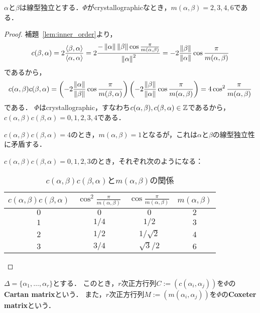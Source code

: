 \begin{proposition}
  $\alpha$と$\beta$は線型独立とする．$\Phi$がcrystallographicなとき，$m(\alpha, \beta) = 2, 3, 4, 6$である．
\end{proposition}
\begin{proof}
  補題~\ref{lem:inner_order}より，
  \begin{equation}
    c(\beta, \alpha)
    = 2\frac{\left\langle \beta, \alpha \right\rangle}{\left\langle \alpha, \alpha \right\rangle}
    = 2\frac{-\left\| \alpha \right\| \left\| \beta \right\| \cos\frac{\pi}{m(\alpha, \beta)}}{\left\| \alpha \right\|^2}
    = -2\frac{\left\| \beta \right\|}{\left\| \alpha \right\|} \cos\frac{\pi}{m(\alpha, \beta)}
  \end{equation}
  であるから，
  \begin{equation}
    c(\alpha, \beta) c(\beta, \alpha)
    = \left( -2\frac{\left\| \alpha \right\|}{\left\| \beta \right\|} \cos\frac{\pi}{m(\beta, \alpha)} \right) \left( -2\frac{\left\| \beta \right\|}{\left\| \alpha \right\|} \cos\frac{\pi}{m(\alpha, \beta)} \right)
    = 4\cos^2 \frac{\pi}{m(\alpha, \beta)}
  \end{equation}
  である．
  $\Phi$はcrystallographic，すなわち$c(\alpha, \beta), c(\beta, \alpha) \in \mathbb{Z}$であるから，$c(\alpha, \beta) c(\beta, \alpha) = 0, 1, 2, 3, 4$である．

  $c(\alpha, \beta) c(\beta, \alpha) = 4$のとき，$m(\alpha, \beta) = 1$となるが，これは$\alpha$と$\beta$の線型独立性に矛盾する．

  $c(\alpha, \beta) c(\beta, \alpha) = 0, 1, 2, 3$のとき，それぞれ次のようになる：
  \begin{table}[htbp]
    \centering
    \caption{$c(\alpha, \beta) c(\beta, \alpha)$と$m(\alpha, \beta)$の関係}
    \label{fig:c_m_relation}
    \begin{tabular}{cccc}
      $c(\alpha, \beta) c(\beta, \alpha)$ & $\cos^2 \frac{\pi}{m(\alpha, \beta)}$ & $\cos\frac{\pi}{m(\alpha, \beta)}$ & $m(\alpha, \beta)$\\ \hline
      $0$ & $0$ & $0$ & $2$ \\
      $1$ & $1/4$ & $1/2$ & $3$\\
      $2$ & $1/2$ & $1/\sqrt2$ & $4$\\
      $3$ & $3/4$ & $\sqrt{3}/2$ & $6$
    \end{tabular}
  \end{table}
\end{proof}

\begin{definition}
  $\Delta = \{\alpha_1, \ldots, \alpha_r\}$とする．
  このとき，$r$次正方行列$C := (c(\alpha_i, \alpha_j))$を$\Phi$の\textbf{Cartan matrix}という．
  また，$r$次正方行列$M := (m(\alpha_i, \alpha_j))$を$\Phi$の\textbf{Coxeter matrix}という．
\end{definition}

